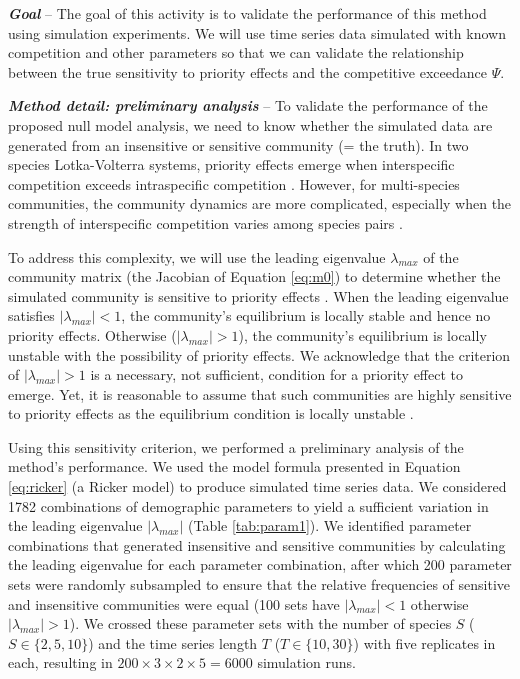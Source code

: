 \documentclass[12pt, class=article, crop=false]{standalone}
\begin{document}
\textbf{\textit{Goal}} -- 
The goal of this activity is to validate the performance of this method using simulation experiments.
We will use time series data simulated with known competition and other parameters so that we can validate the relationship between the true sensitivity to priority effects and the competitive exceedance $\Psi$.

\textbf{\textit{Method detail: preliminary analysis}} -- 
To validate the performance of the proposed null model analysis, we need to know whether the simulated data are generated from an insensitive or sensitive community (= the truth).
In two species Lotka-Volterra systems, priority effects emerge when interspecific competition exceeds intraspecific competition \citep{ke_coexistence_2018}.
However, for multi-species communities, the community dynamics are more complicated, especially when the strength of interspecific competition varies among species pairs \citep{carroll_niche_2011, barabas_chessons_2018}.

To address this complexity, we will use the leading eigenvalue $\lambda_{max}$ of the community matrix (the Jacobian of Equation \ref{eq:m0}) to determine whether the simulated community is sensitive to priority effects \citep{otto_biologists_2011}.
When the leading eigenvalue satisfies $|\lambda_{max}| < 1$, the community's equilibrium is locally stable and hence no priority effects.
Otherwise ($|\lambda_{max}| > 1$), the community's equilibrium is locally unstable with the possibility of priority effects.
We acknowledge that the criterion of $|\lambda_{max}| > 1$ is a necessary, not sufficient, condition for a priority effect to emerge.
Yet, it is reasonable to assume that such communities are highly sensitive to priority effects as the equilibrium condition is locally unstable  \citep{otto_biologists_2011}. 

Using this sensitivity criterion, we performed a preliminary analysis of the method's performance.
We used the model formula presented in Equation \ref{eq:ricker} (a Ricker model) to produce simulated time series data.
We considered 1782 combinations of demographic parameters to yield a sufficient variation in the leading eigenvalue $|\lambda_{max}|$ (Table \ref{tab:param1}).
We identified parameter combinations that generated insensitive and sensitive communities by calculating the leading eigenvalue for each parameter combination, after which 200 parameter sets were randomly subsampled to ensure that the relative frequencies of sensitive and insensitive communities were equal (100 sets have $|\lambda_{max}| < 1$ otherwise $|\lambda_{max}| > 1$).
We crossed these parameter sets with the number of species $S$ ($S \in \{2, 5, 10\}$) and the time series length $T$ ($T \in \{10, 30\}$) with five replicates in each, resulting in $200 \times 3 \times 2 \times 5 = 6000$ simulation runs.
\end{document}
